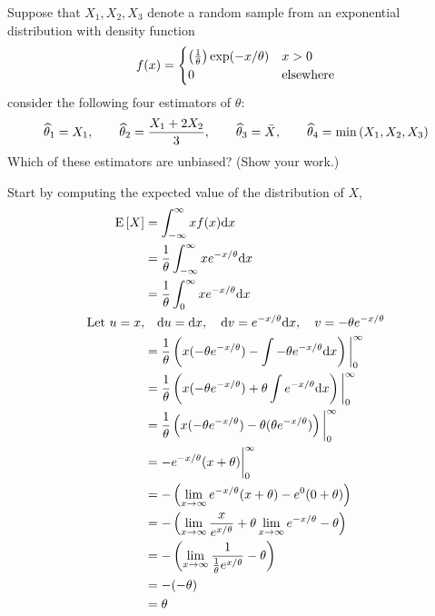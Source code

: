 Suppose that $X_1, X_2, X_3$ denote a random sample from an exponential distribution with density function 
$$f(x) = \begin{cases} 
    \pover{\theta}\exp(-x/\theta) & x>0 \\
    0 & \text{elsewhere} 
 \end{cases}$$
consider the following four estimators of $\theta$:
$$\widehat{\theta}_1 = X_1, \qquad \widehat{\theta}_2 = \frac{X_1 + 2X_2}{3}, \qquad \widehat{\theta}_3 = \bar{X}, \qquad \widehat{\theta}_4 = \operatorname{min}\left( X_1, X_2, X_3 \right)$$
Which of these estimators are unbiased? (Show your work.)

\soln* Start by computing the expected value of the distribution of $X$, 
\begin{align*}
    \Eb{X} &= \int_{-\infty}^{\infty} xf(x) \dd x \\
    &= \over{\theta}\int_{-\infty}^{\infty} xe^{-x/\theta} \dd x\\
    &=  \over{\theta}\int_{0}^{\infty} xe^{-x/\theta} \dd x\\
    \text{Let } u=x,& \quad \dd u = \dd x, \quad \dd v = e^{-x/\theta}\dd x,\quad v = -\theta e^{-x/\theta}\\
    &= \over{\theta} \pars{x(-\theta e^{-x/\theta}) - \int -\theta e^{-x/\theta} \dd x} \bigg|_{0}^{\infty}\\
    &= \over{\theta} \pars{x(-\theta e^{-x/\theta}) + \theta \int  e^{-x/\theta} \dd x} \bigg|_{0}^{\infty} \\
    &=  \over{\theta} \pars{ x(-\theta e^{-x/\theta}) - \theta(\theta e^{-x/\theta})} \bigg|_{0}^{\infty}\\
    &= - e^{-x/\theta}(x+\theta) \bigg|_{0}^{\infty}\\
    &= - \pars{\limx e^{-x/\theta} (x+\theta) - e^{0}(0+\theta)}\\
    &= - \pars{\limx \frac{x}{e^{x/\theta}} + \theta \limx e^{-x/\theta} - \theta}\\
    &= - \pars{\limx \frac{1}{\over{\theta} e^{x/\theta}} - \theta}\\
    &= -(-\theta)\\
    &= \theta
\end{align*}

